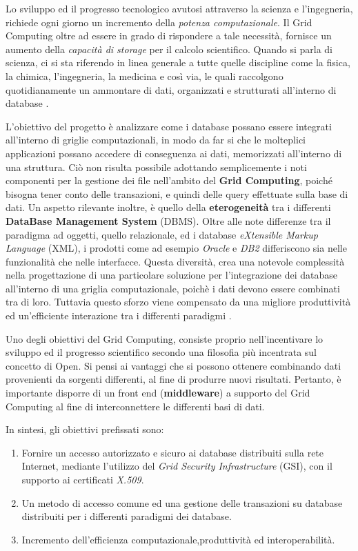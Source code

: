 \documentclass[11pt]{article}
\begin{document}
Lo sviluppo ed il progresso tecnologico avutosi attraverso la scienza e l'ingegneria, richiede ogni giorno un incremento della \emph{potenza computazionale}. Il Grid Computing oltre ad essere in grado di rispondere a tale necessità, fornisce un aumento della \emph{capacità di storage} per il calcolo scientifico.
Quando si parla di scienza, ci si sta riferendo in linea generale a tutte quelle discipline come la fisica, la chimica, l'ingegneria, la medicina e così via, le quali raccolgono quotidianamente un ammontare di dati, organizzati e strutturati all'interno di database \cite{2} \cite{3}.

L'obiettivo del progetto è analizzare come i database possano essere integrati all'interno di griglie computazionali, in modo da far si che le molteplici applicazioni possano accedere di conseguenza ai dati, memorizzati all'interno di una struttura. Ciò non risulta possibile adottando semplicemente i noti componenti per la gestione dei file nell'ambito del \textbf{Grid Computing}, poiché bisogna tener conto delle transazioni, e quindi delle query effettuate sulla base di dati. Un aspetto rilevante inoltre, è quello della \textbf{eterogeneità} tra i differenti \textbf{DataBase Management System} (DBMS). Oltre alle note differenze tra il paradigma ad oggetti, quello relazionale, ed i database \emph{eXtensible Markup Language} (XML), i prodotti come ad esempio \emph{Oracle} e \emph{DB2} differiscono sia nelle funzionalità che nelle interfacce. Questa diversità, crea una notevole complessità nella progettazione di una particolare soluzione per l'integrazione dei database all'interno di una griglia computazionale, poichè i dati devono essere combinati tra di loro. Tuttavia questo sforzo viene compensato da una migliore produttività ed un'efficiente interazione tra i differenti paradigmi \cite{2} \cite{3}.

Uno degli obiettivi del Grid Computing, consiste proprio nell'incentivare lo sviluppo ed il progresso scientifico secondo una filosofia più incentrata sul concetto di Open. Si pensi ai vantaggi che si possono ottenere combinando dati provenienti da sorgenti differenti, al fine di produrre nuovi risultati.
Pertanto, è importante disporre di un front end (\textbf{middleware}) a supporto del Grid Computing al fine di interconnettere le differenti basi di dati.

In sintesi, gli obiettivi prefissati sono:
\begin{enumerate}
\item Fornire un accesso autorizzato e sicuro ai database distribuiti sulla rete Internet, mediante l'utilizzo del \emph{Grid Security Infrastructure} (GSI), con il supporto  ai certificati \emph{X.509}.
\item Un metodo di accesso comune ed una gestione delle transazioni su database distribuiti per i differenti paradigmi dei database.
\item Incremento dell'efficienza computazionale,produttività ed interoperabilità.
\end{enumerate}
\end{document}
